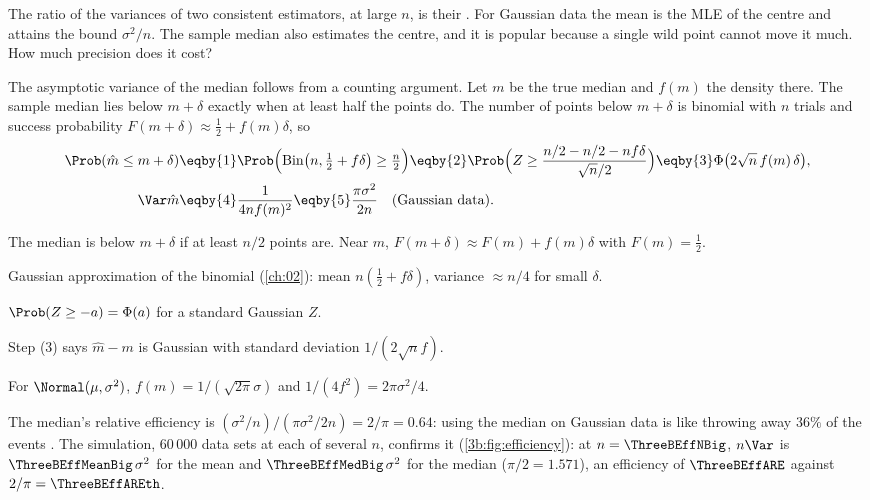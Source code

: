 The ratio of the variances of two consistent estimators, at large $n$, is
their 
. For Gaussian data the mean is the MLE of the
centre and attains the bound $\sigma^2/n$. The sample median also estimates
the centre, and it is popular because a single wild point cannot move it
much. How much precision does it cost?

The asymptotic variance of the median follows from a counting argument. Let
$m$ be the true median and $f(m)$ the density there. The sample median lies
below $m+\delta$ exactly when at least half the points do. The number of
points below $m+\delta$ is binomial with $n$ trials and success probability
$F(m+\delta)\approx\tfrac12+f(m)\delta$, so
\begin{align*}
  \Prob(\hat m\le m+\delta)
  &\eqby{1}\Prob\Bigl(\mathrm{Bin}\bigl(n,\tfrac12+f\delta\bigr)\ge\tfrac n2\Bigr)
  \eqby{2}\Prob\Bigl(Z\ge\frac{n/2-n/2-nf\delta}{\sqrt n/2}\Bigr)
  \eqby{3}\Phi\bigl(2\sqrt n\,f(m)\,\delta\bigr),\\
  \Var\hat m&\eqby{4}\frac{1}{4nf(m)^2}
  \eqby{5}\frac{\pi\sigma^2}{2n}\quad\text{(Gaussian data)}.
\end{align*}
\begin{explain}
  \item The median is below $m+\delta$ if at least $n/2$ points are.
        Near $m$, $F(m+\delta)\approx F(m)+f(m)\delta$ with $F(m)=\tfrac12$.
  \item Gaussian approximation of the binomial (\cref{ch:02}): mean
        $n(\tfrac12+f\delta)$, variance $\approx n/4$ for small $\delta$.
  \item $\Prob(Z\ge-a)=\Phi(a)$ for a standard Gaussian $Z$.
  \item Step (3) says $\hat m-m$ is Gaussian with standard deviation
        $1/(2\sqrt nf)$.
  \item For $\Normal(\mu,\sigma^2)$, $f(m)=1/(\sqrt{2\pi}\sigma)$ and
        $1/(4f^2)=2\pi\sigma^2/4$.
\end{explain}
The median's relative efficiency is $(\sigma^2/n)/(\pi\sigma^2/2n)=2/\pi=0.64$:
using the median on Gaussian data is like throwing away $36\%$ of the
events . The simulation, $60\,000$ data sets at each of
several $n$, confirms it (\cref{3b:fig:efficiency}): at $n=\ThreeBEffNBig$,
$n\Var$ is $\ThreeBEffMeanBig\,\sigma^2$ for the mean and
$\ThreeBEffMedBig\,\sigma^2$ for the median ($\pi/2=1.571$), an efficiency of
$\ThreeBEffARE$ against $2/\pi=\ThreeBEffAREth$.

